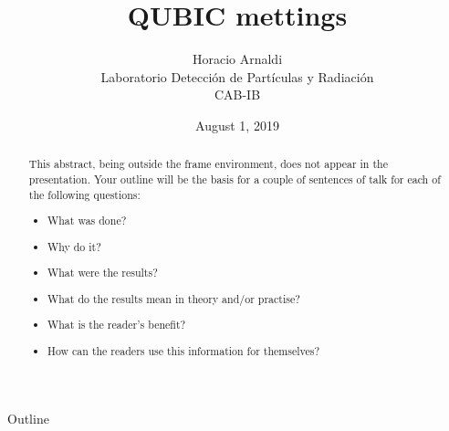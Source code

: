 \documentclass[ignorenonframetext,12pt]{beamer}
\title{QUBIC mettings}
\author{Horacio Arnaldi\\
Laboratorio Detecci\'on de Part\'iculas y Radiaci\'on\\
CAB-IB}
\date{August 1, 2019}
\begin{document}
\begin{frame}
				\maketitle
\end{frame}

\begin{abstract}
				This abstract, being outside the frame environment, does not appear in the presentation.  Your outline will be the basis for a couple of sentences of talk for each of the following questions:
				\begin{itemize}
								\item What was done?
								\item Why do it?
								\item What were the results?
								\item What do the results mean in theory and/or practise?
								\item What is the reader's benefit?
								\item How can the readers use this information for themselves? 
				\end{itemize}
\end{abstract}

\begin{frame}{Outline}
				\tableofcontents
\end{frame}
\end{document}

